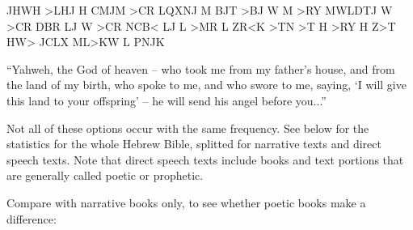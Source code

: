 \documentclass{report}
\newcommand{\cl}[2]{\begingroup\beginL\begingroup\color{#1}\beginR#2\endR\endgroup\endL\endgroup}
\begin{document}
\begin{itemize}
\begin{cjhebrew}
\cl{red}{JHWH >LHJ H CMJM >CR LQXNJ M BJT >BJ W M >RY MWLDTJ W >CR DBR LJ W >CR NCB< LJ L >MR L ZR<K >TN >T H >RY H Z>T} \\
HW> JCLX ML>KW L PNJK
\end{cjhebrew}

``Yahweh, the God of heaven -- who took me from my father’s house, and from the land of my birth, who spoke to me, and who swore to me, saying, `I will give this land to your offspring' -- he will send his angel before you...''
\end{itemize}

Not all of these options occur with the same frequency. See below for the statistics for the whole Hebrew Bible, splitted for narrative texts and direct speech texts. Note that direct speech texts include books and text portions that are generally called poetic or prophetic.\\

\noindent
\begin{minipage}{.5\textwidth}

\end{minipage}
\begin{minipage}{.5\textwidth}
\centering

\end{minipage}

Compare with narrative books only, to see whether poetic books make a difference:\\
\noindent
\begin{minipage}{.5\textwidth}

\end{minipage}
\begin{minipage}{.5\textwidth}
\centering

\end{minipage}
\end{document}
